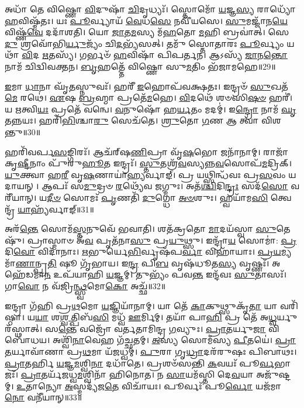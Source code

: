 𑌅𑌧𑌾᳴ 𑌤𑍇 𑌵𑌿𑌷𑍍𑌣𑍋 \ul{𑌵𑌿}\-𑌦𑍁𑌷𑌾᳴ \ul{𑌚𑌿}\-𑌦𑍃𑌧𑍍𑌯𑌃᳴।
𑌸𑍍𑌤𑍋𑌮𑍋᳴ \ul{𑌯}\-𑌜𑍍𑌞\-\ul{𑌸𑍍𑌯} 𑌰𑌾𑌧𑍍𑌯𑍋᳴ \ul{𑌹}\-𑌵𑌿𑌷𑍍𑌮᳴𑌤𑌃।
𑌯𑌃 \ul{𑌪𑍂}\-𑌰𑍍𑌵𑍍𑌯𑌾𑌯᳴ \ul{𑌵𑍇}\-𑌧\-\ul{𑌸𑍇} 𑌨𑌵𑍀᳴𑌯𑌸𑍇।
\-\ul{𑌸𑍁}\-𑌮𑌜𑍍𑌜𑌾᳴𑌨\-\ul{𑌯𑍇} 𑌵𑌿𑌷𑍍𑌣᳴\-\ul{𑌵𑍇} 𑌦𑌦𑌾᳴𑌶𑌤𑌿।
𑌯𑍋 \ul{𑌜𑌾}\-𑌤\-\ul{𑌮}\-𑌸𑍍𑌯 𑌮᳴\-\ul{𑌹}\-𑌤𑍋 \ul{𑌮}\-𑌹𑌿 𑌬𑍍𑌰𑌵𑌾॑𑌤𑍍।
𑌸𑍇\-\ul{𑌦𑍁} 𑌶𑍍𑌰𑌵𑍋᳴𑌭𑌿\-\ul{𑌰𑍍𑌯𑍁}\-𑌜𑍍𑌯𑌂᳴         𑌚𑌿\-\ul{𑌦}\-𑌭𑍍𑌯᳴𑌸𑌤𑍍।
𑌤𑌮𑍁᳴ 𑌸𑍍𑌤𑍋𑌤𑌾𑌰𑌃 \ul{𑌪𑍂}\-𑌰𑍍𑌵𑍍𑌯𑌂 𑌯𑌥𑌾᳴ \ul{𑌵𑌿}\-𑌦 \ul{𑌋}\-𑌤𑌸𑍍𑌯᳴।
𑌗𑌰𑍍𑌭𑍞᳴ \ul{𑌹}\-𑌵𑌿𑌷𑌾᳴ 𑌪𑌿𑌪𑌰𑍍𑌤𑌨।
𑌆𑌽𑌸𑍍𑌯᳴ \ul{𑌜𑌾}\-𑌨\-\ul{𑌨𑍍𑌤𑍋} 𑌨𑌾𑌮᳴ 𑌚𑌿𑌦𑍍𑌵𑌿𑌵𑌕𑍍𑌤𑌨।
\-\ul{𑌬𑍃}\-𑌹𑌤𑍍𑌤𑍇᳴ 𑌵𑌿𑌷𑍍𑌣𑍋 𑌸𑍁\-\ul{𑌮}\-𑌤𑌿𑌂 𑌭᳴𑌜𑌾𑌮𑌹𑍇॥29॥

\-\ul{𑌇}\-𑌮𑌾 \ul{𑌧𑌾}\-𑌨𑌾 𑌘𑍃᳴\-\ul{𑌤}\-𑌸𑍍𑌨𑍁𑌵𑌃᳴।
𑌹𑌰𑍀᳴ \ul{𑌇}\-𑌹𑍋𑌪᳴𑌵𑌕𑍍𑌷𑌤𑌃।
𑌇𑌨𑍍𑌦𑍍𑌰𑍞᳴ \ul{𑌸𑍁}\-𑌖𑌤᳴\-\ul{𑌮𑍇} 𑌰𑌥𑍇॑।
\-\ul{𑌏}\-𑌷 \ul{𑌬𑍍𑌰}\-𑌹𑍍𑌮𑌾 𑌪𑍍𑌰𑌤𑍇᳴\-\ul{𑌮}\-𑌹𑍇।
\-\ul{𑌵𑌿}\-𑌦𑌥𑍇᳴ 𑌶𑍞𑌸𑌿\-\ul{𑌷}\-\-\ul{𑍞} 𑌹𑌰𑍀॑।
𑌯 \ul{𑌋}\-𑌤𑍍𑌵𑌿\-\ul{𑌯𑌃} 𑌪𑍍𑌰𑌤𑍇᳴ 𑌵𑌨𑍍𑌵𑍇।
\-\ul{𑌵}\-𑌨𑍁𑌷𑍋᳴ 𑌹\-\ul{𑌰𑍍𑌯}\-𑌤𑌂 𑌮𑌦𑌮𑍍॑।
𑌇\-\ul{𑌨𑍍𑌦𑍍𑌰𑍋} 𑌨𑌾𑌮᳴ \ul{𑌘𑍃}\-𑌤𑌨𑍍𑌨𑌯𑌃।
𑌹𑌰𑌿᳴\-\ul{𑌭𑌿}\-𑌶𑍍𑌚𑌾\-\ul{𑌰𑍁} 𑌸𑍇𑌚᳴𑌤𑍇।
\-\ul{𑌶𑍍𑌰𑍁}\-𑌤𑍋 \ul{𑌗}\-𑌣 𑌆 𑌤𑍍𑌵𑌾᳴ 𑌵𑌿𑌶𑌨𑍍𑌤𑍁॥30॥

𑌹𑌰𑌿᳴𑌵𑌰𑍍𑌪\-\ul{𑌸}\-𑌙𑍍𑌗𑌿𑌰𑌃᳴।
𑌆𑌚᳴𑌰𑍍‌\mbox{}𑌷\-\ul{𑌣𑌿}\-𑌪𑍍𑌰𑌾 𑌵𑍃᳴\-\ul{𑌷}\-𑌭𑍋 𑌜𑌨𑌾᳴𑌨𑌾𑌮𑍍।
𑌰𑌾𑌜𑌾᳴ 𑌕𑍃\-\ul{𑌷𑍍𑌟𑍀}\-𑌨𑌾𑌂 𑌪𑍁᳴𑌰𑍁\-\ul{𑌹𑍂}\-𑌤 𑌇𑌨𑍍𑌦𑍍𑌰𑌃᳴।
\-\ul{𑌸𑍍𑌤𑍁}\-𑌤𑌶𑍍𑌰᳴\-\ul{𑌵}\-𑌸𑍍𑌯𑌨𑍍𑌨\-\ul{𑌵}\-𑌸𑍋𑌪᳴\-\ul{𑌮}\-𑌦𑍍𑌰𑌿𑌕𑍍।
\-\ul{𑌯𑍁}\-𑌕𑍍𑌤𑍍𑌵𑌾 𑌹\-\ul{𑌰𑍀} 𑌵𑍃\-\ul{𑌷}\-𑌣𑌾𑌯𑌾॑\-\ul{𑌹𑍍𑌯}\-𑌰𑍍𑌵𑌾𑌙𑍍।
𑌪𑍍𑌰 𑌯𑌥𑍍𑌸𑌿𑌨𑍍𑌧᳴𑌵𑌃 𑌪𑍍𑌰\-\ul{𑌸}\-𑌵𑌂 𑌯𑌦𑌾𑌯𑌨𑍍।
𑌆𑌪𑌃᳴ 𑌸\-\ul{𑌮𑍁}\-𑌦𑍍𑌰𑍞 \ul{𑌰}\-𑌥𑍍𑌯𑍇᳴𑌵 𑌜𑌗𑍍𑌮𑍁𑌃।
𑌅𑌤᳴\-\ul{𑌶𑍍𑌚𑌿}\-𑌦𑌿\-\ul{𑌨𑍍𑌦𑍍𑌰𑌃} 𑌸𑌦᳴\-\ul{𑌸𑍋} 𑌵𑌰𑍀᳴𑌯𑌾𑌨𑍍।
𑌯\-\ul{𑌦𑍀}\-\-\ul{𑍞} 𑌸𑍋𑌮𑌃᳴ \ul{𑌪𑍃}\-𑌣𑌤𑌿᳴ \ul{𑌦𑍁}\-𑌗𑍍𑌧𑍋 \ul{𑌅}\-\-\ul{𑍞}\-𑌶𑍁𑌃।
𑌹𑍍𑌵𑌯𑌾᳴𑌮\-\ul{𑌸𑌿} 𑌤𑍍𑌵𑍇𑌨𑍍𑌦𑍍𑌰᳴ \ul{𑌯𑌾}\-𑌹𑍍𑌯᳴𑌰𑍍𑌵𑌾𑌙𑍍॥31॥

𑌅𑌰᳴\-\ul{𑌨𑍍𑌤𑍇} 𑌸𑍋𑌮᳴\-\ul{𑌸𑍍𑌤}\-𑌨𑍁𑌵𑍇᳴ 𑌭𑌵𑌾𑌤𑌿।
𑌶𑌤᳴𑌕𑍍𑌰𑌤𑍋 \ul{𑌮𑌾}\-𑌦𑌯᳴𑌸𑍍𑌵𑌾 \ul{𑌸𑍁}\-𑌤𑍇𑌷𑍁᳴।
𑌪𑍍𑌰𑌾𑌸𑍍𑌮𑌾𑍞 𑌅᳴\-\ul{𑌵} 𑌪𑍃𑌤᳴𑌨𑌾\-\ul{𑌸𑍁} 𑌪𑍍𑌰\-\ul{𑌯𑍁}\-𑌥𑍍𑌸𑍁।
𑌇𑌨𑍍𑌦𑍍𑌰𑌾᳴\-\ul{𑌯} 𑌸𑍋𑌮𑌾॑: \ul{𑌪𑍍𑌰}\-𑌦𑌿\-\ul{𑌵𑍋} 𑌵𑌿𑌦𑌾᳴𑌨𑌾𑌃।
\-\ul{𑌋}\-𑌭𑍁𑌰𑍍𑌯𑍇\-\ul{𑌭𑌿}\-𑌰𑍍𑌵𑍃𑌷᳴𑌪\-\ul{𑌰𑍍𑌵𑌾} 𑌵𑌿𑌹𑌾᳴𑌯𑌾𑌃।
\-\ul{𑌪𑍍𑌰}\-\-\ul{𑌯}\-𑌮𑍍𑌯𑌮𑌾᳴\-\ul{𑌣𑌾}\-𑌨𑍍𑌪𑍍𑌰\-\ul{𑌤𑌿} 𑌷𑍂 𑌗𑍃᳴𑌭𑌾𑌯।
𑌇\-\ul{𑌨𑍍𑌦𑍍𑌰} 𑌪𑌿\-\ul{𑌬} 𑌵𑍃𑌷᳴𑌧𑍂𑌤\-\ul{𑌸𑍍𑌯} 𑌵𑍃𑌷𑍍𑌣𑌃᳴।
𑌅𑌹𑍇᳴𑌡𑌮𑌾\-\ul{𑌨} 𑌉𑌪᳴𑌯𑌾𑌹𑌿 \ul{𑌯}\-𑌜𑍍𑌞𑌮𑍍।
𑌤𑍁𑌭𑍍𑌯𑌂᳴ 𑌪𑌵\-\ul{𑌨𑍍𑌤} 𑌇𑌨𑍍𑌦᳴𑌵𑌃 \ul{𑌸𑍁}\-𑌤𑌾𑌸𑌃᳴।
𑌗𑌾\-\ul{𑌵𑍋} 𑌨 𑌵᳴𑌜𑍍𑌰𑌿\-\ul{𑌨𑍍𑌥𑍍𑌸𑍍𑌵}\-𑌮𑍋\-\ul{𑌕𑍋} 𑌅𑌚𑍍𑌛᳴॥32॥

𑌇𑌨𑍍𑌦𑍍𑌰𑌾 𑌗᳴𑌹𑌿 𑌪𑍍𑌰\-\ul{𑌥}\-𑌮𑍋 \ul{𑌯}\-𑌜𑍍𑌞𑌿𑌯𑌾᳴𑌨𑌾𑌮𑍍।
𑌯𑌾 𑌤𑍇᳴ \ul{𑌕𑌾}\-𑌕𑍁𑌥𑍍𑌸𑍁𑌕𑍃᳴\-\ul{𑌤𑌾} 𑌯𑌾 𑌵𑌰𑌿᳴𑌷𑍍𑌠𑌾।
𑌯\-\ul{𑌯𑌾} 𑌶\-\ul{𑌶𑍍𑌵}\-𑌤𑍍𑌪𑌿𑌬᳴\-\ul{𑌸𑌿} 𑌮𑌧𑍍𑌵᳴ \ul{𑌊}\-𑌰𑍍𑌮𑌿𑌮𑍍।
𑌤𑌯𑌾᳴ 𑌪𑌾\-\ul{𑌹𑌿} 𑌪𑍍𑌰 𑌤𑍇᳴ 𑌅\-\ul{𑌧𑍍𑌵}\-𑌰𑍍𑌯𑍁𑌰᳴𑌸𑍍𑌥𑌾𑌤𑍍।
𑌸\-\ul{𑌨𑍍𑌤𑍇} 𑌵𑌜𑍍𑌰𑍋᳴ 𑌵𑌰𑍍𑌤𑌤𑌾𑌮𑌿𑌨𑍍𑌦𑍍𑌰 \ul{𑌗}\-𑌵𑍍𑌯𑍁𑌃।
\-\ul{𑌪𑍍𑌰𑌾}\-\-\ul{𑌤}\-𑌰𑍍𑌯𑍁\-\ul{𑌜𑌾} 𑌵𑌿 𑌬𑍋᳴𑌧𑌯।
𑌅𑌶𑍍𑌵𑌿᳴\-\ul{𑌨𑌾}\-𑌵𑍇𑌹 𑌗᳴𑌚𑍍𑌛𑌤𑌮𑍍।
\-\ul{𑌅}\-𑌸𑍍𑌯 𑌸𑍋𑌮᳴𑌸𑍍𑌯 \ul{𑌪𑍀}\-𑌤𑌯𑍇॑।
\-\ul{𑌪𑍍𑌰𑌾}\-\-\ul{𑌤}\-𑌰𑍍𑌯𑌾𑌵𑌾᳴𑌣𑌾 𑌪𑍍𑌰\-\ul{𑌥}\-𑌮𑌾 𑌯᳴𑌜𑌧𑍍𑌵𑌮𑍍।
\-\ul{𑌪𑍁}\-𑌰𑌾 𑌗𑍃\-\ul{𑌧𑍍𑌰𑌾}\-𑌦𑌰᳴𑌰𑍁𑌷𑌃 𑌪𑌿𑌬𑌾𑌥𑌃।
\-\ul{𑌪𑍍𑌰𑌾}\-𑌤𑌰𑍍\mbox{}𑌹𑌿 \ul{𑌯}\-𑌜𑍍𑌞\-\ul{𑌮}\-𑌶𑍍𑌵𑌿\-\ul{𑌨𑌾} 𑌦𑌧𑌾᳴𑌤𑍇।
𑌪𑍍𑌰𑌶𑍞᳴𑌸𑌨𑍍𑌤𑌿 \ul{𑌕}\-𑌵𑌯𑌃᳴ 𑌪𑍂\-\ul{𑌰𑍍𑌵}\-𑌭𑌾𑌜𑌃᳴।
\-\ul{𑌪𑍍𑌰𑌾}\-𑌤𑌰𑍍𑌯᳴𑌜𑌧𑍍𑌵\-\ul{𑌮}\-𑌶𑍍𑌵𑌿𑌨𑌾᳴ 𑌹𑌿𑌨𑍋𑌤।
𑌨 \ul{𑌸𑌾}\-𑌯𑌮᳴𑌸𑍍𑌤𑌿 𑌦𑍇\-\ul{𑌵}\-𑌯𑌾 𑌅𑌜𑍁᳴𑌷𑍍𑌟𑌮𑍍।
\-\ul{𑌉}\-𑌤𑌾𑌨𑍍𑌯𑍋 \ul{𑌅}\-𑌸𑍍𑌮𑌦𑍍𑌯᳴𑌜\-\ul{𑌤𑍇} 𑌵𑌿𑌚𑌾᳴𑌯𑌃।
𑌪𑍂𑌰𑍍𑌵𑌃᳴ 𑌪𑍂\-\ul{𑌰𑍍𑌵𑍋} 𑌯𑌜᳴𑌮𑌾\-\ul{𑌨𑍋} 𑌵𑌨𑍀᳴𑌯𑌾𑌨𑍍॥33॥\anuvakamend[\-\ul{𑌚𑌾}\-\-\ul{𑌶𑍍𑌵}\-𑌜𑌿𑌦𑍍𑌯𑍋 𑌗᳴𑌚𑍍𑌛𑌤𑌂 \ul{𑌨𑍋} 𑌦𑌾\-\ul{𑌶}\-𑌨𑍍𑌨𑌾𑌮𑌾᳴\-\ul{𑌭𑌿}\-𑌶𑍍𑌰𑍀𑌰𑍍𑌗᳴𑌮𑍇𑌮 \ul{𑌸}\-𑌪𑍍𑌰𑌥𑌾᳴ 𑌭𑌜𑌾𑌮𑌹𑍇 𑌵𑌿𑌶𑌨𑍍𑌤𑍁 \ul{𑌯𑌾}\-𑌹𑍍𑌯᳴𑌰𑍍𑌵𑌾𑌙𑌚𑍍𑌛᳴ 𑌪𑌿𑌬𑌾\-\ul{𑌥𑌃} 𑌷𑌟𑍍𑌚᳴]

